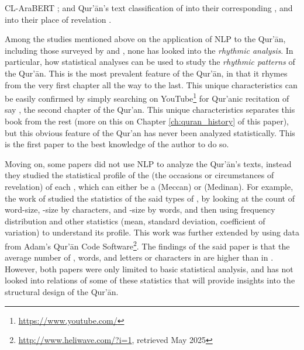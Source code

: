 CL-AraBERT ; and Qur'\=an's text classification of   into their corresponding   , and into their place of revelation .

Among the studies mentioned above on the application of NLP to the Qur'\=an, including those surveyed by  and , none has looked into the \textit{rhythmic analysis}. In particular, how statistical analyses can be used to study the \textit{rhythmic patterns} of the Qur'\=an. This is the most prevalent feature of the Qur'\=an, in that it rhymes from the very first chapter all the way to the last. This unique characteristics can be easily confirmed by simply searching on YouTube\footnote{\url{https://www.youtube.com/}} for Qur'anic recitation of say  , the second chapter of the Qur'an. This unique characteristics separates this book from the rest (more on this on Chapter \ref{ch:quran_history} of this paper), but this obvious feature of the Qur'an has never been analyzed statistically. This is the first paper to the best knowledge of the author to do so. 

Moving on, some papers did not use NLP to analyze the Qur'\=an's texts, instead they studied the statistical profile of the   (the occasions or circumstances of revelation) of each  , which can either be a   (Meccan) or   (Medinan). For example, the work of  studied the statistics of the said types of  , by looking at the count of word-size,  -size by characters, and  -size by words, and then using frequency distribution and other statistics (mean, standard deviation, coefficient of variation) to understand its profile. This work was further extended by \cite{Hasan2022NumericalSO} using data from Adam's Qur'\=an Code Software\footnote{\url{http://www.heliwave.com/?i=1}, retrieved May 2025}. The findings of the said paper is that the average number of  , words, and letters or characters in   are higher than in  . However, both papers were only limited to basic statistical analysis, and has not looked into relations of some of these statistics that will provide insights into the structural design of the Qur'\=an.

